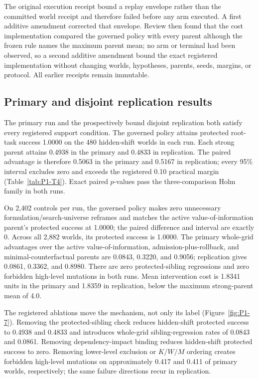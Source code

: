 The original execution receipt bound a replay envelope rather than the committed
world receipt and therefore failed before any arm executed. A first additive
amendment corrected that envelope. Review then found that the cost
implementation compared the governed policy with every parent although the
frozen rule names the maximum parent mean; no arm or terminal had been observed,
so a second additive amendment bound the exact registered implementation without
changing worlds, hypotheses, parents, seeds, margins, or protocol. All earlier
receipts remain immutable.

\subsection{Primary and disjoint replication results}

The primary run and the prospectively bound disjoint replication both satisfy
every registered support condition. The governed policy attains protected
root-task success 1.0000 on the 480 hidden-shift worlds in each run. Each strong
parent attains 0.4938 in the primary and 0.4833 in replication. The paired
advantage is therefore 0.5063 in the primary and 0.5167 in replication; every
95\% interval excludes zero and exceeds the registered 0.10 practical margin
(Table~\ref{tab:P1-T4}). Exact paired $p$-values pass the three-comparison Holm
family in both runs.



On 2,402 controls per run, the governed policy makes zero unnecessary
formulation/search-universe reframes and matches the active
value-of-information parent's protected success at 1.0000; the paired difference
and interval are exactly 0. Across all 2,882 worlds, its protected success is
1.0000. The primary whole-grid advantages over the active value-of-information,
admission-plus-rollback, and minimal-counterfactual parents are 0.0843, 0.3220,
and 0.9056; replication gives 0.0861, 0.3362, and 0.8980. There are zero
protected-sibling regressions and zero forbidden high-level mutations in both
runs. Mean intervention cost is 1.8341 units in the primary and 1.8359 in
replication, below the maximum strong-parent mean of 4.0.

The registered ablations move the mechanism, not only its label
(Figure~\ref{fig:P1-7}). Removing the protected-sibling check reduces
hidden-shift protected success to 0.4938 and 0.4833 and introduces whole-grid
sibling-regression rates of 0.0843 and 0.0861. Removing dependency-impact
binding reduces hidden-shift protected success to zero. Removing lower-level
exclusion or $K/W/M$ ordering creates forbidden high-level mutations on
approximately 0.417 and 0.411 of primary worlds, respectively; the same failure
directions recur in replication.

